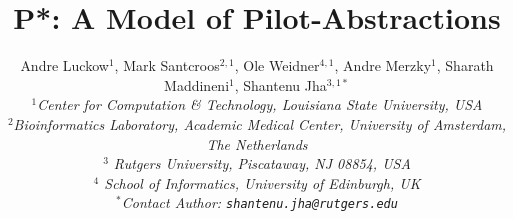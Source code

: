 \documentclass[conference,final]{IEEEtran}
\title{P*: A Model of Pilot-Abstractions}
\date{}
\newcommand{\up}{\vspace*{-1em}}
\begin{document}
\ifpdf
{}
\else
{}
\fi

\author{
  Andre Luckow$^{1}$, Mark Santcroos$^{2,1}$, Ole Weidner$^{4,1}$, Andre Merzky$^{1}$, Sharath Maddineni$^{1}$, Shantenu Jha$^{3,1*}$\\
  \small{\emph{$^{1}$Center for Computation \& Technology, Louisiana State University, USA}}\\
  \small{\emph{$^{2}$Bioinformatics Laboratory, Academic Medical Center, University of Amsterdam, The Netherlands}}\\
  \small{\emph{$^{3}$ Rutgers University, Piscataway, NJ 08854, USA}}\\
  \small{\emph{$^{4}$ School of Informatics, University of Edinburgh, UK }}\\
  \small{\emph{$^{*}$Contact Author: \texttt{shantenu.jha@rutgers.edu}}}\\
  \up\up\up\up }

\maketitle
\end{document}
